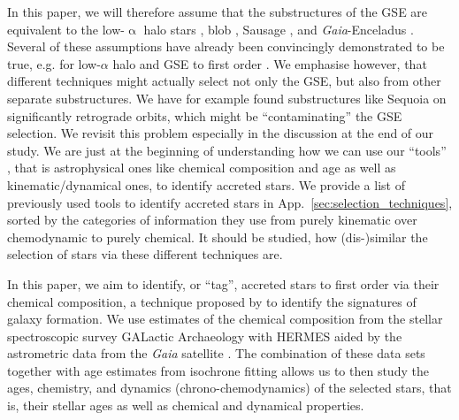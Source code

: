 \documentclass[fleqn,usenatbib]{mnras}
\newcommand{\Gaia}{\textit{Gaia}\xspace} %
\begin{document}
In this paper, we will therefore assume that the substructures of the GSE are equivalent to the low-$\upalpha$ halo stars \citep{Nissen2010, Hayes2018}, blob \citep{Koppelman2018, Das2020}, Sausage \citep{Belokurov2018}, and \Gaia-Enceladus \citep{Helmi2018}. Several of these assumptions have already been convincingly demonstrated to be true, e.g. for low-$\alpha$ halo and GSE to first order \citep{Haywood2018, Mackereth2019}. We emphasise however, that different techniques might actually select not only the GSE, but also from other separate substructures. We have for example found substructures like Sequoia \citep{Barba2019, Myeong2019} on significantly retrograde orbits, which might be ``contaminating'' the GSE selection. We revisit this problem especially in the discussion at the end of our study. 
We are just at the beginning of understanding how we can use our ``tools'' \citep{Helmi2020}, that is astrophysical ones like chemical composition and age as well as kinematic/dynamical ones, to identify accreted stars. We provide a list of previously used tools to identify accreted stars in App.~\ref{sec:selection_techniques}, sorted by the categories of information they use from purely kinematic over chemodynamic to purely chemical. It should be studied, how (dis-)similar the selection of stars via these different techniques are.

In this paper, we aim to identify, or ``tag'', accreted stars to first order via their chemical composition, a technique proposed by \citet{FreemanBlandHawthorn2002} to identify the signatures of galaxy formation. We use estimates of the chemical composition from the stellar spectroscopic survey GALactic Archaeology with HERMES \citep[GALAH, ][]{DeSilva2015, Buder2021} aided by the astrometric data from the \Gaia satellite \citep{Brown2021}. The combination of these data sets together with age estimates from isochrone fitting allows us to then study the ages, chemistry, and dynamics (chrono-chemodynamics) of the selected stars, that is, their stellar ages as well as chemical and dynamical properties.
\end{document}
